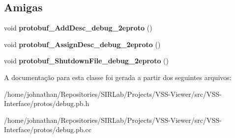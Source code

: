 \subsection*{Amigas}
\begin{DoxyCompactItemize}
\item 
void {\bfseries protobuf\+\_\+\+Add\+Desc\+\_\+debug\+\_\+2eproto} ()\hypertarget{classvss__debug_1_1Pose_a1b63d082883c064c19c50d8480e334a9}{}\label{classvss__debug_1_1Pose_a1b63d082883c064c19c50d8480e334a9}

\item 
void {\bfseries protobuf\+\_\+\+Assign\+Desc\+\_\+debug\+\_\+2eproto} ()\hypertarget{classvss__debug_1_1Pose_acdc8c7570bce883b7ac02f39e0d06b54}{}\label{classvss__debug_1_1Pose_acdc8c7570bce883b7ac02f39e0d06b54}

\item 
void {\bfseries protobuf\+\_\+\+Shutdown\+File\+\_\+debug\+\_\+2eproto} ()\hypertarget{classvss__debug_1_1Pose_a887dbf1466fd19ec2c6fb3c242c65a67}{}\label{classvss__debug_1_1Pose_a887dbf1466fd19ec2c6fb3c242c65a67}

\end{DoxyCompactItemize}


A documentação para esta classe foi gerada a partir dos seguintes arquivos\+:\begin{DoxyCompactItemize}
\item 
/home/johnathan/\+Repositories/\+S\+I\+R\+Lab/\+Projects/\+V\+S\+S-\/\+Viewer/src/\+V\+S\+S-\/\+Interface/protos/debug.\+pb.\+h\item 
/home/johnathan/\+Repositories/\+S\+I\+R\+Lab/\+Projects/\+V\+S\+S-\/\+Viewer/src/\+V\+S\+S-\/\+Interface/protos/debug.\+pb.\+cc\end{DoxyCompactItemize}
